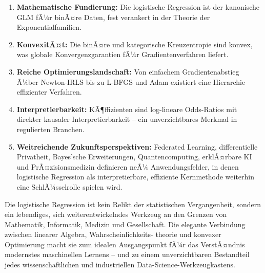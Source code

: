 ﻿\documentclass[12pt, a4paper]{article}
\theoremstyle{definition}
\theoremstyle{remark}
\begin{document}
\begin{enumerate}[label=(\roman*)]
  \item \textbf{Mathematische Fundierung:} Die logistische Regression ist der kanonische
    GLM fÃ¼r binÃ¤re Daten, fest verankert in der Theorie der Exponentialfamilien.
  \item \textbf{KonvexitÃ¤t:} Die binÃ¤re und kategorische Kreuzentropie sind konvex,
    was globale Konvergenzgarantien fÃ¼r Gradientenverfahren liefert.
  \item \textbf{Reiche Optimierungslandschaft:} Von einfachem Gradientenabstieg Ã¼ber
    Newton-IRLS bis zu L-BFGS und Adam existiert eine Hierarchie effizienter Verfahren.
  \item \textbf{Interpretierbarkeit:} KÃ¶ffizienten sind log-lineare Odds-Ratios mit
    direkter kausaler Interpretierbarkeit -- ein unverzichtbares Merkmal in regulierten Branchen.
  \item \textbf{Weitreichende Zukunftsperspektiven:} Federated Learning, differentielle
    Privatheit, Bayes'sche Erweiterungen, Quantencomputing, erklÃ¤rbare KI und PrÃ¤zisionsmedizin
    definieren neÃ¼ Anwendungsfelder, in denen logistische Regression als interpretierbare,
    effiziente Kernmethode weiterhin eine SchlÃ¼sselrolle spielen wird.
\end{enumerate}

Die logistische Regression ist kein Relikt der statistischen Vergangenheit, sondern ein
lebendiges, sich weiterentwickelndes Werkzeug an den Grenzen von Mathematik, Informatik,
Medizin und Gesellschaft. Die elegante Verbindung zwischen linearer Algebra, Wahrscheinlichkeits-
theorie und konvexer Optimierung macht sie zum idealen Ausgangspunkt fÃ¼r das VerstÃ¤ndnis
modernstes maschinellen Lernens -- und zu einem unverzichtbaren Bestandteil jedes
wissenschaftlichen und industriellen Data-Science-Werkzeugkastens.
\end{document}

